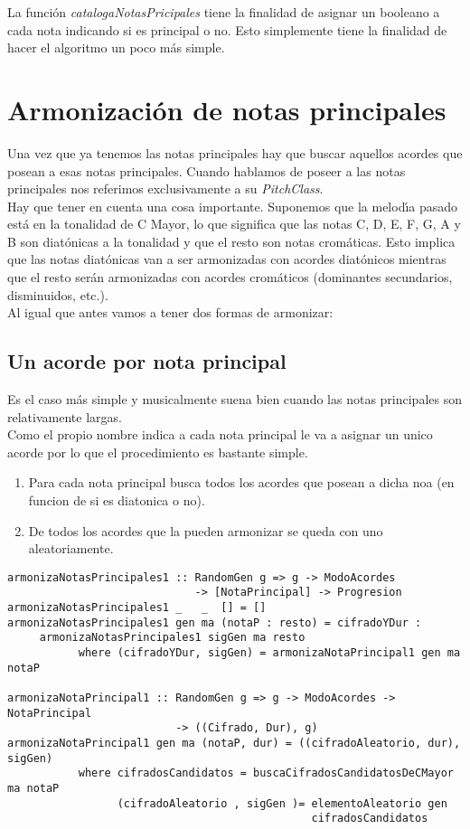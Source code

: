\documentclass[a4paper]{report}
\begin{document}
\normalsize
\indent La funci\'on \emph{catalogaNotasPricipales} tiene la finalidad de
asignar un booleano a cada nota indicando si es principal o no.
Esto simplemente tiene la finalidad de hacer el algoritmo un 
poco m\'as simple.\\

\section{Armonizaci\'on de notas principales}
Una vez que ya tenemos las notas principales hay que buscar aquellos
acordes que posean a esas notas principales. Cuando hablamos de
poseer a las notas principales nos referimos exclusivamente
a su \emph{PitchClass}.\\
\indent Hay que tener en cuenta una cosa importante. Suponemos que la 
melod\'\i a pasado est\'a en la tonalidad de C Mayor, lo que
significa que las notas C, D, E, F, G, 
A y B son diat\'onicas a la tonalidad
y que el resto son notas crom\'aticas. Esto implica que las notas 
diat\'onicas van a ser armonizadas con acordes diat\'onicos mientras 
que el resto ser\'an armonizadas con acordes crom\'aticos (dominantes
secundarios, disminuidos, etc.).\\
\indent Al igual que antes vamos a tener dos formas de armonizar:

\subsection{Un acorde por nota principal}
Es el caso m\'as simple y musicalmente suena bien cuando las
notas principales son relativamente largas.\\
\indent Como el propio nombre indica a cada nota principal le va a 
asignar un unico acorde por lo que el procedimiento es bastante simple.

\begin{enumerate}
\item Para cada nota principal busca todos los acordes que posean a dicha
noa (en funcion de si es diatonica o no).
\item De todos los acordes que la pueden armonizar se queda con
uno aleatoriamente.
\end{enumerate}
\small
\begin{verbatim}
armonizaNotasPrincipales1 :: RandomGen g => g -> ModoAcordes 
                             -> [NotaPrincipal] -> Progresion
armonizaNotasPrincipales1 _   _  [] = []
armonizaNotasPrincipales1 gen ma (notaP : resto) = cifradoYDur : 
     armonizaNotasPrincipales1 sigGen ma resto
           where (cifradoYDur, sigGen) = armonizaNotaPrincipal1 gen ma notaP

armonizaNotaPrincipal1 :: RandomGen g => g -> ModoAcordes -> NotaPrincipal 
                          -> ((Cifrado, Dur), g)
armonizaNotaPrincipal1 gen ma (notaP, dur) = ((cifradoAleatorio, dur), sigGen)
           where cifradosCandidatos = buscaCifradosCandidatosDeCMayor ma notaP
                 (cifradoAleatorio , sigGen )= elementoAleatorio gen 
                                               cifradosCandidatos 
\end{verbatim}
\normalsize
\end{document}
